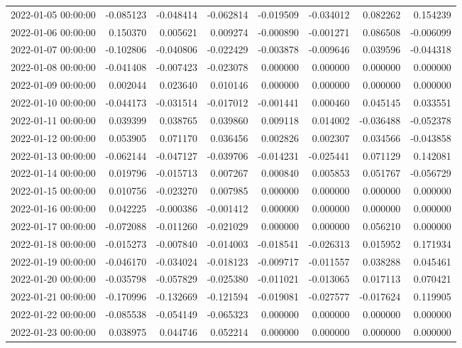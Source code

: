 \begin{tabular}{lrrrrrrr}
2022-01-05 00:00:00 & -0.085123 & -0.048414 & -0.062814 & -0.019509 & -0.034012 & 0.082262 & 0.154239 \\
2022-01-06 00:00:00 & 0.150370 & 0.005621 & 0.009274 & -0.000890 & -0.001271 & 0.086508 & -0.006099 \\
2022-01-07 00:00:00 & -0.102806 & -0.040806 & -0.022429 & -0.003878 & -0.009646 & 0.039596 & -0.044318 \\
2022-01-08 00:00:00 & -0.041408 & -0.007423 & -0.023078 & 0.000000 & 0.000000 & 0.000000 & 0.000000 \\
2022-01-09 00:00:00 & 0.002044 & 0.023640 & 0.010146 & 0.000000 & 0.000000 & 0.000000 & 0.000000 \\
2022-01-10 00:00:00 & -0.044173 & -0.031514 & -0.017012 & -0.001441 & 0.000460 & 0.045145 & 0.033551 \\
2022-01-11 00:00:00 & 0.039399 & 0.038765 & 0.039860 & 0.009118 & 0.014002 & -0.036488 & -0.052378 \\
2022-01-12 00:00:00 & 0.053905 & 0.071170 & 0.036456 & 0.002826 & 0.002307 & 0.034566 & -0.043858 \\
2022-01-13 00:00:00 & -0.062144 & -0.047127 & -0.039706 & -0.014231 & -0.025441 & 0.071129 & 0.142081 \\
2022-01-14 00:00:00 & 0.019796 & -0.015713 & 0.007267 & 0.000840 & 0.005853 & 0.051767 & -0.056729 \\
2022-01-15 00:00:00 & 0.010756 & -0.023270 & 0.007985 & 0.000000 & 0.000000 & 0.000000 & 0.000000 \\
2022-01-16 00:00:00 & 0.042225 & -0.000386 & -0.001412 & 0.000000 & 0.000000 & 0.000000 & 0.000000 \\
2022-01-17 00:00:00 & -0.072088 & -0.011260 & -0.021029 & 0.000000 & 0.000000 & 0.056210 & 0.000000 \\
2022-01-18 00:00:00 & -0.015273 & -0.007840 & -0.014003 & -0.018541 & -0.026313 & 0.015952 & 0.171934 \\
2022-01-19 00:00:00 & -0.046170 & -0.034024 & -0.018123 & -0.009717 & -0.011557 & 0.038288 & 0.045461 \\
2022-01-20 00:00:00 & -0.035798 & -0.057829 & -0.025380 & -0.011021 & -0.013065 & 0.017113 & 0.070421 \\
2022-01-21 00:00:00 & -0.170996 & -0.132669 & -0.121594 & -0.019081 & -0.027577 & -0.017624 & 0.119905 \\
2022-01-22 00:00:00 & -0.085538 & -0.054149 & -0.065323 & 0.000000 & 0.000000 & 0.000000 & 0.000000 \\
2022-01-23 00:00:00 & 0.038975 & 0.044746 & 0.052214 & 0.000000 & 0.000000 & 0.000000 & 0.000000 \\

\end{tabular}
